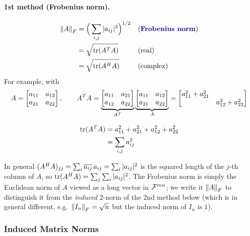\paragraph{1st method (Frobenius norm).}
\begin{align*}
\norm{A}_F &= \Big(\sum_{i,j} |a_{ij}|^2\Big)^{1/2} && \text{(\term{Frobenius norm})}\\
&= \sqrt{\tr(A\T A)} && \text{(real)}\\
&= \sqrt{\tr(A\Hm A)} && \text{(complex)}
\end{align*}
For example, with
\begin{gather*}
A = \begin{bmatrix}a_{11} & a_{12}\\ a_{21} & a_{22}\end{bmatrix},
\qquad
A^{T} A = \underbrace{\begin{bmatrix}a_{11} & a_{21}\\ a_{12} & a_{22}\end{bmatrix}}_{A^{T}}
\underbrace{\begin{bmatrix}a_{11} & a_{12}\\ a_{21} & a_{22}\end{bmatrix}}_{A}
= \begin{bmatrix}a_{11}^2 + a_{21}^2 & \\ & a_{12}^2 + a_{22}^2\end{bmatrix}
\\[8pt]
\begin{aligned}
\operatorname{tr}(A^{T} A) &= a_{11}^2 + a_{21}^2 + a_{12}^2 + a_{22}^2\\
&= \sum_{i,j} a_{ij}^2
\end{aligned}
\end{gather*}
\begin{insight}
In general $(A^{H} A)_{jj} = \sum_i \overline{a_{ij}}\,a_{ij} = \sum_i |a_{ij}|^2$ is the squared length of the $j$-th column of $A$, so
$\operatorname{tr}(A^{H} A) = \sum_j\sum_i |a_{ij}|^2$. The Frobenius norm is simply the Euclidean norm of $A$ viewed as a long vector in $\mathcal{F}^{mn}$; we write it $\left\lVert A \right\rVert_F$ to distinguish it from the \emph{induced} $2$-norm of the 2nd method below (which is in general different, e.g.\ $\left\lVert I_n \right\rVert_F = \sqrt n$ but the induced norm of $I_n$ is $1$).
\end{insight}

\subsubsection{Induced Matrix Norms}
